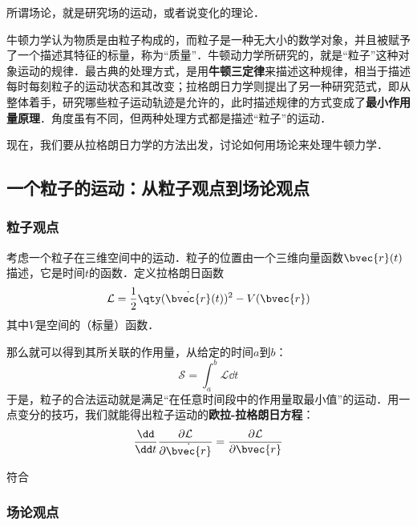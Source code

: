 





所谓场论，就是研究场的运动，或者说变化的理论．

牛顿力学认为物质是由粒子构成的，而粒子是一种无大小的数学对象，并且被赋予了一个描述其特征的标量，称为“质量”．牛顿动力学所研究的，就是“粒子”这种对象运动的规律．最古典的处理方式，是用\textbf{牛顿三定律}来描述这种规律，相当于描述每时每刻粒子的运动状态和其改变；拉格朗日力学则提出了另一种研究范式，即从整体着手，研究哪些粒子运动轨迹是允许的，此时描述规律的方式变成了\textbf{最小作用量原理}．角度虽有不同，但两种处理方式都是描述“粒子”的运动．

现在，我们要从拉格朗日力学的方法出发，讨论如何用场论来处理牛顿力学．


\subsection{一个粒子的运动：从粒子观点到场论观点}

\subsubsection{粒子观点}

考虑一个粒子在三维空间中的运动．粒子的位置由一个三维向量函数$\bvec{r}(t)$描述，它是时间$t$的函数．定义拉格朗日函数
\begin{equation}
\mathcal{L}=\frac{1}{2}\qty(\dot{\bvec{r}}(t))^2-V(\bvec{r})
\end{equation}
其中$V$是空间的（标量）函数．

那么就可以得到其所关联的作用量，从给定的时间$a$到$b$：
\begin{equation}
\mathcal{S}=\int ^b_a \mathcal{L} \dd t
\end{equation}
于是，粒子的合法运动就是满足“在任意时间段中的作用量取最小值”的运动．用一点变分的技巧，我们就能得出粒子运动的\textbf{欧拉-拉格朗日方程}：
\begin{equation}\label{CFa1_eq1}
\frac{\dd}{\dd t}\frac{\partial\mathcal{L}}{\partial \dot{\bvec{r}}} = \frac{\partial\mathcal{L}}{\partial \bvec{r}}
\end{equation}

符合


\subsubsection{场论观点}

